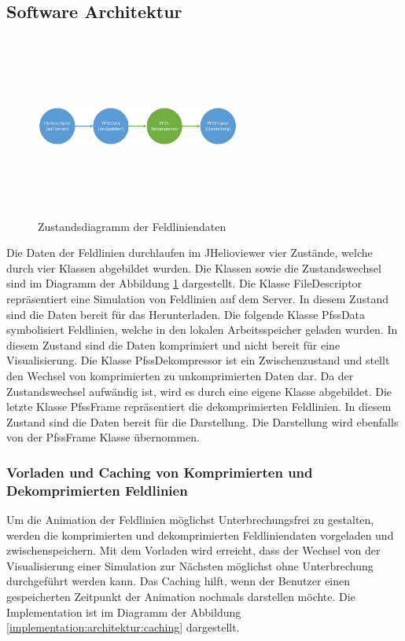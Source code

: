 \subsection{Software Architektur}
\begin{figure}[!htbp]
	\center
	\includegraphics[width=0.6\textwidth,height=6cm,keepaspectratio]{./pictures/implementation/dataflow.png}
	\caption{Zustandsdiagramm der Feldliniendaten}
	\label{implementation:architektur:datenfluss}
\end{figure}
Die Daten der Feldlinien durchlaufen im JHelioviewer vier Zustände, welche durch vier Klassen abgebildet wurden. Die Klassen sowie die Zustandswechsel sind im Diagramm der Abbildung \ref{implementation:architektur:datenfluss} dargestellt. Die Klasse FileDescriptor repräsentiert eine Simulation von Feldlinien auf dem Server. In diesem Zustand sind die Daten bereit für das Herunterladen. Die folgende Klasse PfssData symbolisiert Feldlinien, welche in den lokalen Arbeitsspeicher geladen wurden. In diesem Zustand sind die Daten komprimiert und nicht bereit für eine Visualisierung. Die Klasse PfssDekompressor ist ein Zwischenzustand und stellt den Wechsel von komprimierten zu unkomprimierten Daten dar. Da der Zustandswechsel aufwändig ist, wird es durch eine eigene Klasse abgebildet. Die letzte Klasse PfssFrame repräsentiert die dekomprimierten Feldlinien. In diesem Zustand sind die Daten bereit für die Darstellung. Die Darstellung wird ebenfalls von der PfssFrame Klasse übernommen.

\subsubsection{Vorladen und Caching von Komprimierten und Dekomprimierten Feldlinien}
Um die Animation der Feldlinien möglichst Unterbrechungsfrei zu gestalten, werden die komprimierten und dekomprimierten Feldliniendaten vorgeladen und zwischenspeichern. Mit dem Vorladen wird erreicht, dass der Wechsel von der Visualisierung einer Simulation zur Nächsten möglichst ohne Unterbrechung durchgeführt werden kann. Das Caching hilft, wenn der Benutzer einen gespeicherten Zeitpunkt der Animation nochmals darstellen möchte. Die Implementation ist im Diagramm der Abbildung \ref{implementation:architektur:caching} dargestellt.


